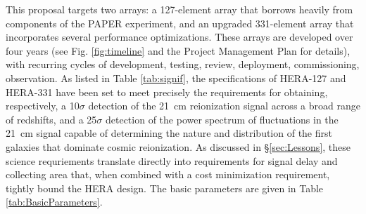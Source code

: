 \documentclass[preprint]{aastex}
\begin{document}
This proposal targets two arrays: a 127-element array that borrows heavily
from components of the PAPER experiment, and an upgraded 331-element array that
incorporates several performance optimizations.  
These arrays are developed over four years (see Fig. \ref{fig:timeline} and the Project Management Plan for details),
with recurring cycles of development, testing, review, deployment, commissioning, observation.
As listed in Table \ref{tab:signif}, the specifications of HERA-127
and HERA-331 have been set to meet precisely the requirements for obtaining,
respectively, a 10$\sigma$ detection of the 21~cm reionization signal across a broad range of redshifts, and a
25$\sigma$ detection of the power spectrum of fluctuations in the 21~cm signal
capable of determining the nature and distribution of the first galaxies that
dominate cosmic reionization.  
As discussed in
\S\ref{sec:Lessons}, these science requriements translate directly into
requirements for signal delay and collecting area that, when 
combined with a cost minimization requirement, tightly
bound the HERA design.  The basic parameters are given in Table \ref{tab:BasicParameters}.
\end{document}
